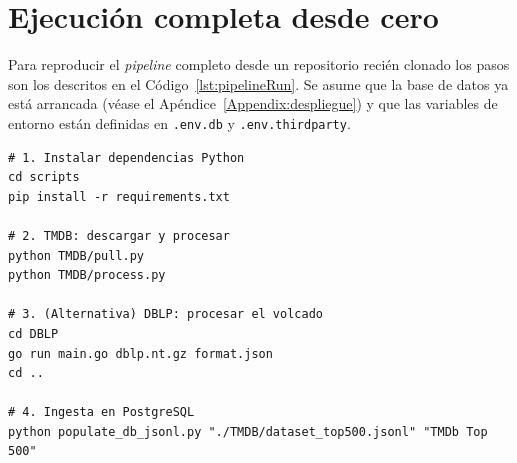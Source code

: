 \section{Ejecución completa desde cero}

Para reproducir el \textit{pipeline} completo desde un repositorio recién
clonado los pasos son los descritos en el Código~\ref{lst:pipelineRun}.
Se asume que la base de datos ya está arrancada (véase el
Apéndice~\ref{Appendix:despliegue}) y que las variables de entorno
están definidas en \texttt{.env.db} y \texttt{.env.thirdparty}.

\begin{lstlisting}[style=bashStyle, caption=Ejecución del \textit{pipeline} completo, label=lst:pipelineRun]
# 1. Instalar dependencias Python
cd scripts
pip install -r requirements.txt

# 2. TMDB: descargar y procesar
python TMDB/pull.py
python TMDB/process.py

# 3. (Alternativa) DBLP: procesar el volcado
cd DBLP
go run main.go dblp.nt.gz format.json
cd ..

# 4. Ingesta en PostgreSQL
python populate_db_jsonl.py "./TMDB/dataset_top500.jsonl" "TMDb Top 500"
\end{lstlisting}
